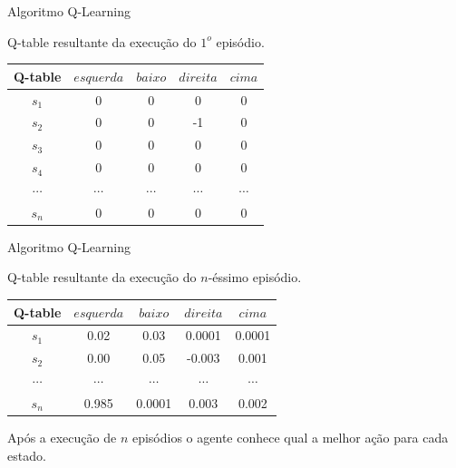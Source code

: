 \documentclass{beamer}
\begin{document}
\begin{frame}{Algoritmo Q-Learning}

Q-table resultante da execução do $1^{o}$ episódio. 

	\begin{center}
	\begin{tabular}{ |c|c|c|c|c| } 
		\hline
		\textbf{Q-table}  & $esquerda$ & $baixo$ & $direita$& $cima$ \\
		\hline
		$s_{1}$& 0  & 0 & 0 & 0\\ 
		\hline
		$s_{2}$& 0 & 0  & -1 & 0\\ 
		\hline
$s_{3}$& 0 & 0 & 0 & 0\\ 
\hline
$s_{4}$& 0 & 0  & 0  &  0\\ 
\hline
		$\cdots$& $\cdots$ & $\cdots$ & $\cdots$ &$\cdots$ \\ 
		\hline
		$s_{n}$& 0 & 0  & 0  & 0 \\ 
		\hline
	\end{tabular}
\end{center}
\end{frame}

%
%
%

\begin{frame}{Algoritmo Q-Learning}

Q-table resultante da execução do $n$-éssimo episódio. 

\begin{center}
	\begin{tabular}{ |c|c|c|c|c| } 
		\hline
		\textbf{Q-table}  & $esquerda$ & $baixo$ & $direita$& $cima$ \\
		\hline
		$s_{1}$& 0.02  & 0.03 & 0.0001 & 0.0001\\ 
		\hline
		$s_{2}$& 0.00 & 0.05 & -0.003 & 0.001\\ 
		\hline
		$\cdots$& $\cdots$ & $\cdots$ & $\cdots$ &$\cdots$ \\ 
		\hline
		$s_{n}$& 0.985 & 0.0001  & 0.003  & 0.002 \\ 
		\hline
	\end{tabular}
\end{center}

Após a execução de $n$ episódios o agente conhece qual a melhor ação para cada estado. 

\end{frame}
\end{document}
